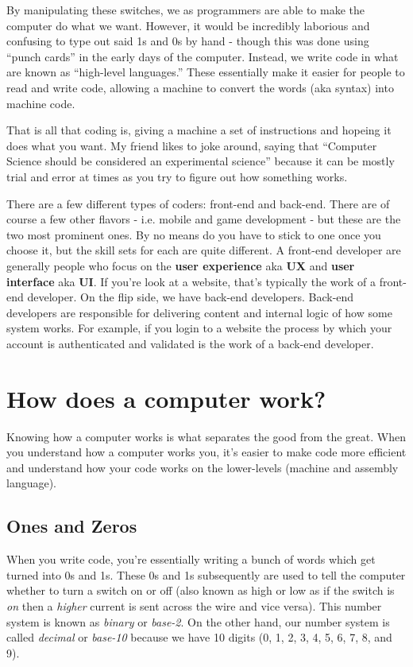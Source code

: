 \documentclass[12pt,a4paper]{book}
\begin{document}
		By manipulating these switches, we as programmers are able to make the computer do what we want. However, it would be incredibly laborious and confusing to type out said 1s and 0s by hand - though this was done using ``punch cards'' in the early days of the computer. Instead, we write code in what are known as ``high-level languages.'' These essentially make it easier for people to read and write code, allowing a machine to convert the words (aka syntax) into machine code.
		
		That is all that coding is, giving a machine a set of instructions and hopeing it does what you want. My friend likes to joke around, saying that ``Computer Science should be considered an experimental science'' because it can be mostly trial and error at times as you try to figure out how something works. 
		
		There are a few different types of coders: front-end and back-end. There are of course a few other flavors - i.e. mobile and game development - but these are the two most prominent ones. By no means do you have to stick to one once you choose it, but the skill sets for each are quite different. A front-end developer are generally people who focus on the \textbf{user experience} aka \textbf{UX} and \textbf{user interface} aka \textbf{UI}. If you're look at a website, that's typically the work of a front-end developer. On the flip side, we have back-end developers. Back-end developers are responsible for delivering content and internal logic of how some system works. For example, if you login to a website the process by which your account is authenticated and validated is the work of a back-end developer.

	\chapter{How does a computer work?}  \label{chap:computers}
		Knowing how a computer works is what separates the good from the great. When you understand how a computer works you, it's easier to make code more efficient and understand how your code works on the lower-levels (machine and assembly language).
		\section{Ones and Zeros} \label{sec:computers-binary}
			When you write code, you're essentially writing a bunch of words which get turned into 0s and 1s. These 0s and 1s subsequently are used to tell the computer whether to turn a switch on or off (also known as high or low as if the switch is \textit{on} then a \textit{higher} current is sent across the wire and vice versa). This number system is known as \textit{binary} or \textit{base-2}. On the other hand, our number system is called \textit{decimal} or \textit{base-10} because we have 10 digits (0, 1, 2, 3, 4, 5, 6, 7, 8, and 9).
\end{document}
